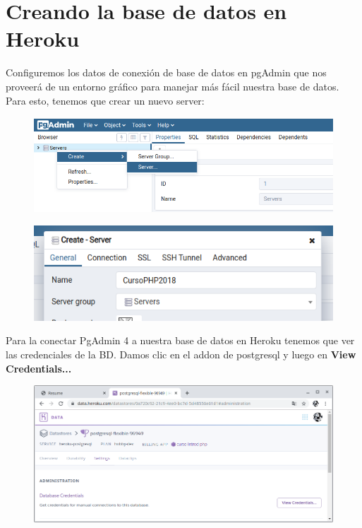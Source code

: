 \documentclass{article}
\begin{document}
\section{Creando la base de datos en Heroku}%
Configuremos los datos de conexión de base de datos en pgAdmin que nos proveerá
de un entorno gráfico para manejar más fácil nuestra base de datos.\\

Para esto, tenemos que crear un nuevo server:

\begin{figure}[h!]
  \centering
  \includegraphics[scale=0.5]{./Pictures/268_create_server.png}
\end{figure}

\begin{figure}[h!]
  \centering
  \includegraphics[scale=0.5]{./Pictures/271_name_server.png}
\end{figure}

Para la conectar PgAdmin 4 a nuestra base de datos en Heroku tenemos que ver
las credenciales de la BD. Damos clic en el addon de postgresql y luego en
\textbf{View Credentials...}

\begin{figure}[h!]
  \centering
  \includegraphics[scale=0.5]{./Pictures/269_addon_postgres.png}
\end{figure}
\end{document}
